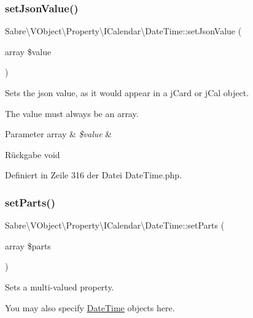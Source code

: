 \subsubsection{\texorpdfstring{set\+Json\+Value()}{setJsonValue()}}
{\footnotesize\ttfamily Sabre\textbackslash{}\+V\+Object\textbackslash{}\+Property\textbackslash{}\+I\+Calendar\textbackslash{}\+Date\+Time\+::set\+Json\+Value (\begin{DoxyParamCaption}\item[{array}]{\$value }\end{DoxyParamCaption})}

Sets the json value, as it would appear in a j\+Card or j\+Cal object.

The value must always be an array.


\begin{DoxyParams}[1]{Parameter}
array & {\em \$value} & \\
\hline
\end{DoxyParams}
\begin{DoxyReturn}{Rückgabe}
void 
\end{DoxyReturn}


Definiert in Zeile 316 der Datei Date\+Time.\+php.

\mbox{\label{class_sabre_1_1_v_object_1_1_property_1_1_i_calendar_1_1_date_time_aea44d2e1c0a51c006f511eadf13a2b29}} 
\subsubsection{\texorpdfstring{set\+Parts()}{setParts()}}
{\footnotesize\ttfamily Sabre\textbackslash{}\+V\+Object\textbackslash{}\+Property\textbackslash{}\+I\+Calendar\textbackslash{}\+Date\+Time\+::set\+Parts (\begin{DoxyParamCaption}\item[{array}]{\$parts }\end{DoxyParamCaption})}

Sets a multi-\/valued property.

You may also specify \mbox{\hyperlink{class_sabre_1_1_v_object_1_1_property_1_1_i_calendar_1_1_date_time}{Date\+Time}} objects here.


